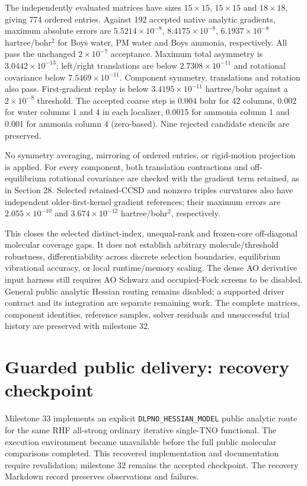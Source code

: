 \documentclass[11pt]{article}
\begin{document}
The independently evaluated matrices have sizes $15\times15$,
$15\times15$ and $18\times18$, giving 774 ordered entries. Against 192
accepted native analytic gradients, maximum absolute errors are
$5.5214\times10^{-8}$,
$8.4175\times10^{-8}$,
$6.1937\times10^{-8}$ hartree/bohr$^2$
for Boys water, PM water and Boys ammonia, respectively. All pass the
unchanged $2\times10^{-7}$ acceptance. Maximum total asymmetry is
$3.0442\times10^{-13}$; left/right translations are below
$2.7308\times10^{-11}$ and rotational covariance below
$7.5469\times10^{-11}$. Component symmetry, translations and rotation also pass.
First-gradient replay is below $3.4195\times10^{-11}$ hartree/bohr
against a $2\times10^{-8}$ threshold. The accepted coarse step is
0.004 bohr for 42 columns, 0.002 for water columns 1 and 4 in each
localizer, 0.0015 for ammonia column 1 and 0.001 for ammonia column 4
(zero-based). Nine rejected candidate stencils are preserved.


No symmetry averaging, mirroring of ordered entries, or rigid-motion
projection is applied. For every component, both translation contractions
and off-equilibrium rotational covariance are checked with the gradient
term retained, as in Section 28. Selected retained-CCSD and nonzero triples
curvatures also have independent older-first-kernel gradient references;
their maximum errors are $2.055\times10^{-10}$ and
$3.674\times10^{-12}$ hartree/bohr$^2$, respectively.

This closes the selected distinct-index, unequal-rank and frozen-core
off-diagonal molecular coverage gaps. It does not establish arbitrary
molecule/threshold robustness, differentiability across discrete selection
boundaries, equilibrium vibrational accuracy, or local runtime/memory
scaling. The dense AO derivative input harness still requires AO Schwarz
and occupied-Fock screens to be disabled. General public analytic Hessian
routing remains disabled; a supported driver contract and its integration
are separate remaining work. The complete matrices, component identities,
reference samples, solver residuals and unsuccessful trial history are
preserved with milestone 32.


\section{Guarded public delivery: recovery checkpoint}
Milestone 33 implements an explicit \texttt{DLPNO\_HESSIAN\_MODEL} public
analytic route for the same RHF all-strong ordinary iterative single-TNO
functional. The execution environment became unavailable before the full
public molecular comparisons completed. This recovered implementation and
documentation require revalidation; milestone 32 remains the accepted
checkpoint. The recovery Markdown record preserves observations and failures.
\end{document}
